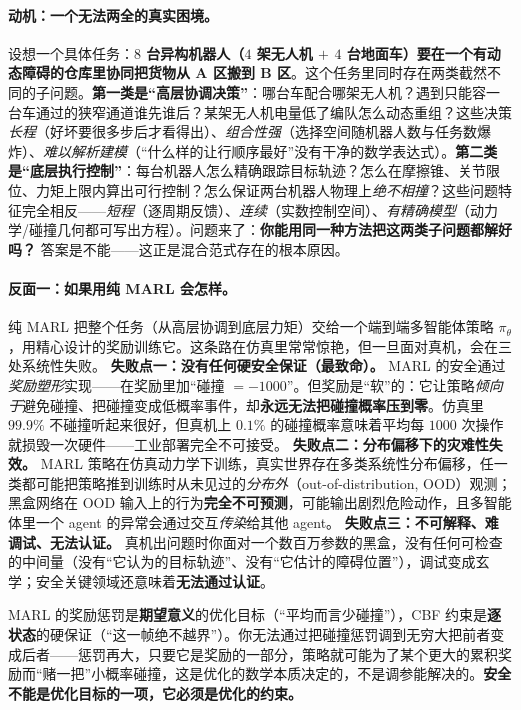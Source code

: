 \paragraph{动机：一个无法两全的真实困境。}
设想一个具体任务：\textbf{$8$ 台异构机器人（$4$ 架无人机 $+$ $4$ 台地面车）要在一个有动态障碍的仓库里协同把货物从 A 区搬到 B 区}。这个任务里同时存在两类截然不同的子问题。\textbf{第一类是“高层协调决策”}：哪台车配合哪架无人机？遇到只能容一台车通过的狭窄通道谁先谁后？某架无人机电量低了编队怎么动态重组？这些决策\emph{长程}（好坏要很多步后才看得出）、\emph{组合性强}（选择空间随机器人数与任务数爆炸）、\emph{难以解析建模}（“什么样的让行顺序最好”没有干净的数学表达式）。\textbf{第二类是“底层执行控制”}：每台机器人怎么精确跟踪目标轨迹？怎么在摩擦锥、关节限位、力矩上限内算出可行控制？怎么保证两台机器人物理上\emph{绝不相撞}？这些问题特征完全相反——\emph{短程}（逐周期反馈）、\emph{连续}（实数控制空间）、\emph{有精确模型}（动力学/碰撞几何都可写出方程）。问题来了：\textbf{你能用同一种方法把这两类子问题都解好吗？} 答案是不能——这正是混合范式存在的根本原因。

\paragraph{反面一：如果用纯 MARL 会怎样。}
纯 MARL 把整个任务（从高层协调到底层力矩）交给一个端到端多智能体策略 $\pi_\theta$，用精心设计的奖励训练它。这条路在仿真里常常惊艳，但一旦面对真机，会在三处系统性失败。
\textbf{失败点一：没有任何硬安全保证（最致命）。} MARL 的安全通过\emph{奖励塑形}实现——在奖励里加“碰撞 $=-1000$”。但奖励是“软”的：它让策略\emph{倾向于}避免碰撞、把碰撞变成低概率事件，却\textbf{永远无法把碰撞概率压到零}。仿真里 $99.9\%$ 不碰撞听起来很好，但真机上 $0.1\%$ 的碰撞概率意味着平均每 $1000$ 次操作就损毁一次硬件——工业部署完全不可接受。
\textbf{失败点二：分布偏移下的灾难性失效。} MARL 策略在仿真动力学下训练，真实世界存在多类系统性分布偏移，任一类都可能把策略推到训练时从未见过的\emph{分布外}（out-of-distribution, OOD）观测；黑盒网络在 OOD 输入上的行为\textbf{完全不可预测}，可能输出剧烈危险动作，且多智能体里一个 agent 的异常会通过交互\emph{传染}给其他 agent。
\textbf{失败点三：不可解释、难调试、无法认证。} 真机出问题时你面对一个数百万参数的黑盒，没有任何可检查的中间量（没有“它认为的目标轨迹”、没有“它估计的障碍位置”），调试变成玄学；安全关键领域还意味着\textbf{无法通过认证}。

\begin{insight}
MARL 的奖励惩罚是\textbf{期望意义}的优化目标（“平均而言少碰撞”），CBF 约束是\textbf{逐状态}的硬保证（“这一帧绝不越界”）。你无法通过把碰撞惩罚调到无穷大把前者变成后者——惩罚再大，只要它是奖励的一部分，策略就可能为了某个更大的累积奖励而“赌一把”小概率碰撞，这是优化的数学本质决定的，不是调参能解决的。\textbf{安全不能是优化目标的一项，它必须是优化的约束。}
\end{insight}

